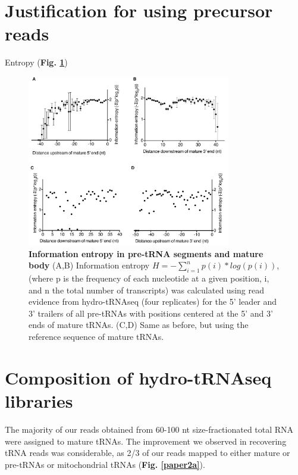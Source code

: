 \documentclass[12pt]{rockefeller}
\begin{document}
\section{Justification for using precursor reads}

Entropy (\textbf{Fig. \ref{supp1}})

\begin{figure}[!ht]%
\centering
\includegraphics[width=3.5in]{supp1.png}%
\caption[Information entropy in pre-tRNA segments and mature body]{\textbf{Information entropy in pre-tRNA segments and mature body}
(A,B) Information entropy $H = -\sum_{i=1}^np(i)*log(p(i))$, (where p is the frequency of each nucleotide at a given position, i, and n the total number of transcripts) was calculated using read evidence from hydro-tRNAseq (four replicates) for the 5’ leader and 3’ trailers of all pre-tRNAs with positions centered at the 5’ and 3’ ends of mature tRNAs. (C,D) Same as before, but using the reference sequence of mature tRNAs.}
\centering
\label{supp1}%
\end{figure}

\section{Composition of hydro-tRNAseq libraries}
The majority of our reads obtained from 60-100 nt size-fractionated total RNA were assigned to mature tRNAs.
The improvement we observed in recovering tRNA reads was considerable, as 2/3 of our reads mapped to either mature or pre-tRNAs or mitochondrial tRNAs (\textbf{Fig. \ref{paper2a}}). 
\end{document}
